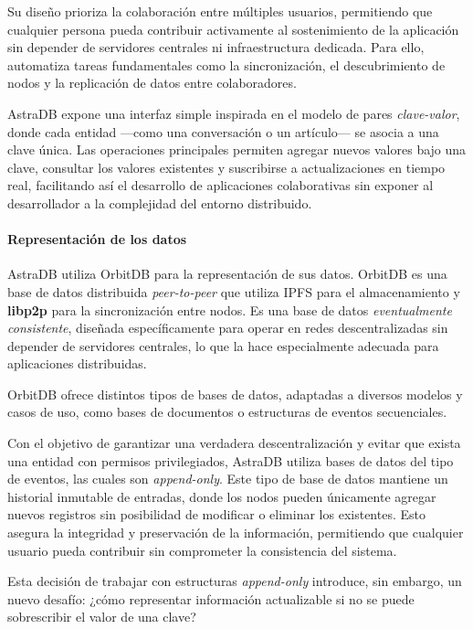 Su diseño prioriza la colaboración entre múltiples usuarios, permitiendo que cualquier persona pueda contribuir activamente al sostenimiento de la aplicación sin depender de servidores centrales ni infraestructura dedicada. Para ello, automatiza tareas fundamentales como la sincronización, el descubrimiento de nodos y la replicación de datos entre colaboradores.

AstraDB expone una interfaz simple inspirada en el modelo de pares \textit{clave-valor}, donde cada entidad —como una conversación o un artículo— se asocia a una clave única. Las operaciones principales permiten agregar nuevos valores bajo una clave, consultar los valores existentes y suscribirse a actualizaciones en tiempo real, facilitando así el desarrollo de aplicaciones colaborativas sin exponer al desarrollador a la complejidad del entorno distribuido.

\paragraph{Representación de los datos}

AstraDB utiliza OrbitDB para la representación de sus datos. OrbitDB es una base de datos distribuida \textit{peer-to-peer} que utiliza IPFS para el almacenamiento y \textbf{libp2p} \cite{libp2p} para la sincronización entre nodos. Es una base de datos \textit{eventualmente consistente}, diseñada específicamente para operar en redes descentralizadas sin depender de servidores centrales, lo que la hace especialmente adecuada para aplicaciones distribuidas.

OrbitDB ofrece distintos tipos de bases de datos, adaptadas a diversos modelos y casos de uso, como bases de documentos o estructuras de eventos secuenciales.

Con el objetivo de garantizar una verdadera descentralización y evitar que exista una entidad con permisos privilegiados, AstraDB utiliza bases de datos del tipo de eventos, las cuales son \textit{append-only}. Este tipo de base de datos mantiene un historial inmutable de entradas, donde los nodos pueden únicamente agregar nuevos registros sin posibilidad de modificar o eliminar los existentes. Esto asegura la integridad y preservación de la información, permitiendo que cualquier usuario pueda contribuir sin comprometer la consistencia del sistema.

Esta decisión de trabajar con estructuras \textit{append-only} introduce, sin embargo, un nuevo desafío: ¿cómo representar información actualizable si no se puede sobrescribir el valor de una clave?

